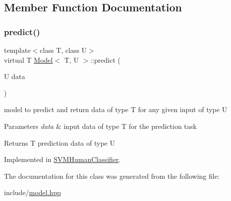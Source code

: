 \subsection{Member Function Documentation}
\mbox{\label{classModel_aab70aeca992eb3a1ce09667e169b8743}} 
\subsubsection{\texorpdfstring{predict()}{predict()}}
{\footnotesize\ttfamily template$<$class T, class U$>$ \\
virtual T \hyperlink{classModel}{Model}$<$ T, U $>$\+::predict (\begin{DoxyParamCaption}\item[{U}]{data }\end{DoxyParamCaption})\hspace{0.3cm}{\ttfamily [pure virtual]}}



model to predict and return data of type T for any given input of type U 


\begin{DoxyParams}{Parameters}
{\em data} & input data of type T for the prediction task \\
\hline
\end{DoxyParams}
\begin{DoxyReturn}{Returns}
T prediction data of type U 
\end{DoxyReturn}


Implemented in \hyperlink{classSVMHumanClassifier_a14a416a22355b1426d7611082dfa2464}{S\+V\+M\+Human\+Classifier}.



The documentation for this class was generated from the following file\+:\begin{DoxyCompactItemize}
\item 
include/\hyperlink{model_8hpp}{model.\+hpp}\end{DoxyCompactItemize}
